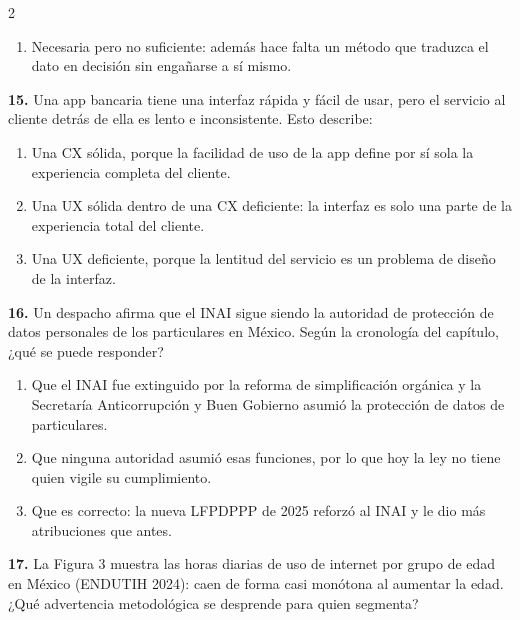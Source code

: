 \documentclass[10pt,letterpaper]{article}
\begin{document}
\begin{multicols}{2}
\begin{enumerate}[label=\alph*),leftmargin=1.1em,itemsep=0pt,topsep=1pt,parsep=0pt,partopsep=0pt]
\item Necesaria pero no suficiente: además hace falta un método que traduzca el dato en decisión sin engañarse a sí mismo.
\end{enumerate}
\vspace{2pt}
\noindent\textbf{15.} Una app bancaria tiene una interfaz rápida y fácil de usar, pero el servicio al cliente detrás de ella es lento e inconsistente. Esto describe:
\vspace{-3pt}
\begin{enumerate}[label=\alph*),leftmargin=1.1em,itemsep=0pt,topsep=1pt,parsep=0pt,partopsep=0pt]
\item Una CX sólida, porque la facilidad de uso de la app define por sí sola la experiencia completa del cliente.
\item Una UX sólida dentro de una CX deficiente: la interfaz es solo una parte de la experiencia total del cliente.
\item Una UX deficiente, porque la lentitud del servicio es un problema de diseño de la interfaz.
\end{enumerate}
\vspace{2pt}
\noindent\textbf{16.} Un despacho afirma que el INAI sigue siendo la autoridad de protección de datos personales de los particulares en México. Según la cronología del capítulo, ¿qué se puede responder?
\vspace{-3pt}
\begin{enumerate}[label=\alph*),leftmargin=1.1em,itemsep=0pt,topsep=1pt,parsep=0pt,partopsep=0pt]
\item Que el INAI fue extinguido por la reforma de simplificación orgánica y la Secretaría Anticorrupción y Buen Gobierno asumió la protección de datos de particulares.
\item Que ninguna autoridad asumió esas funciones, por lo que hoy la ley no tiene quien vigile su cumplimiento.
\item Que es correcto: la nueva LFPDPPP de 2025 reforzó al INAI y le dio más atribuciones que antes.
\end{enumerate}
\vspace{2pt}
\noindent\textbf{17.} La Figura 3 muestra las horas diarias de uso de internet por grupo de edad en México (ENDUTIH 2024): caen de forma casi monótona al aumentar la edad. ¿Qué advertencia metodológica se desprende para quien segmenta?
\vspace{-3pt}
\begin{enumerate}[label=\alph*),leftmargin=1.1em,itemsep=0pt,topsep=1pt,parsep=0pt,partopsep=0pt]

\end{enumerate}
\end{multicols}
\end{document}
